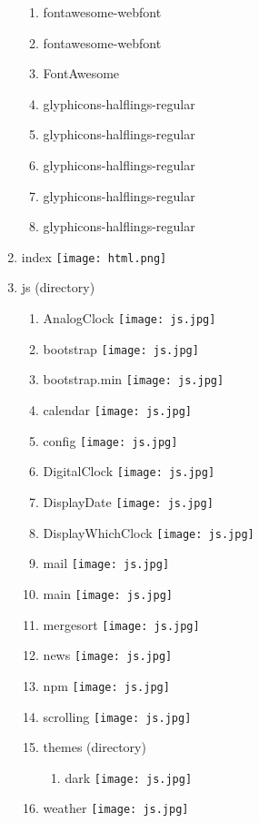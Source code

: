 \begin{enumerate}
\begin{enumerate}
    \item fontawesome-webfont
    \item fontawesome-webfont
    \item FontAwesome
    \item glyphicons-halflings-regular
    \item glyphicons-halflings-regular
    \item glyphicons-halflings-regular
    \item glyphicons-halflings-regular
    \item glyphicons-halflings-regular
\end{enumerate}
\item index \texttt{[image: html.png]}
\item js (directory)
\begin{enumerate}
    \item AnalogClock \texttt{[image: js.jpg]}
    \item bootstrap \texttt{[image: js.jpg]}
    \item bootstrap.min \texttt{[image: js.jpg]}
    \item calendar \texttt{[image: js.jpg]}
    \item config \texttt{[image: js.jpg]}
    \item DigitalClock \texttt{[image: js.jpg]}
    \item DisplayDate \texttt{[image: js.jpg]}
    \item DisplayWhichClock \texttt{[image: js.jpg]}
    \item mail \texttt{[image: js.jpg]}
    \item main \texttt{[image: js.jpg]}
    \item mergesort \texttt{[image: js.jpg]}
    \item news \texttt{[image: js.jpg]}
    \item npm \texttt{[image: js.jpg]}
    \item scrolling \texttt{[image: js.jpg]}
    \item themes (directory)
    \begin{enumerate}
        \item dark \texttt{[image: js.jpg]}
    \end{enumerate}
    \item weather \texttt{[image: js.jpg]}
\end{enumerate}

\end{enumerate}
